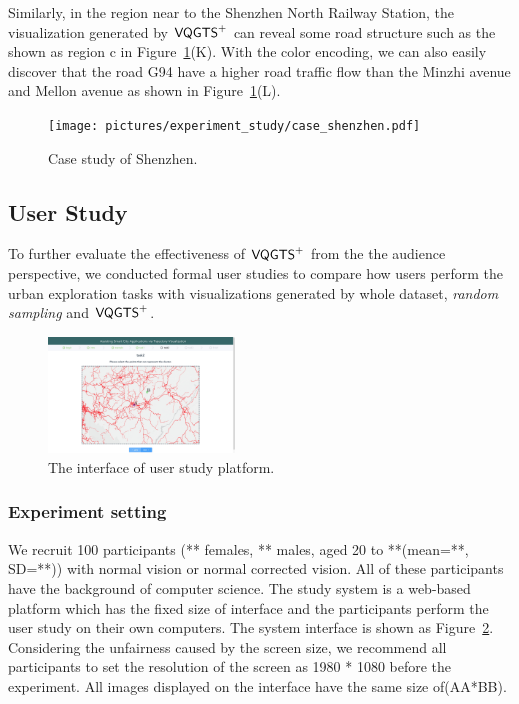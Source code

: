 Similarly, in the region near to the Shenzhen North Railway Station, the visualization generated by $\mathsf{VQGTS}^{+}$ can reveal some road structure such as the  shown as region c in Figure~\ref{fig:shenzhen}(K). With the color encoding, we can also easily discover that the road G94 have a higher road traffic flow than the Minzhi avenue and Mellon avenue as shown in Figure~\ref{fig:shenzhen}(L).

\begin{figure}[t]
	\centering
	\vspace{2mm}
	\texttt{[image: pictures/experiment\_study/case\_shenzhen.pdf]}
	\caption{Case study of Shenzhen.}
	\vspace{0mm}
	\label{fig:shenzhen}
\end{figure}


\subsection{User Study}
To further evaluate the effectiveness of $\mathsf{VQGTS}^{+}$ from the the audience perspective, we conducted formal user studies to compare how users perform the urban exploration tasks with visualizations generated by whole dataset, \textit{random sampling} and $\mathsf{VQGTS}^{+}$.


\begin{figure}[t]
	\centering
	\includegraphics[width=0.44\textwidth]{pictures/user_study/interface.jpg}
	\vspace{-3mm}
	\caption{The interface of user study platform.}
	\vspace{-5mm}
	\label{fig:user_study}
\end{figure}

\subsubsection{Experiment setting}

We recruit 100 participants (** females, ** males, aged 20 to **(mean=**, SD=**)) with normal vision or normal corrected vision. All of these participants have the background of computer science.
The study system is a web-based platform which has the fixed size of interface and the participants perform the user study on their own  computers.  The system interface is shown as Figure~\ref{fig:user_study}. Considering the unfairness caused by the screen size, we recommend all participants to set the resolution of the screen as 1980 * 1080 before the experiment. All images displayed on the interface have the same size of(AA*BB).

